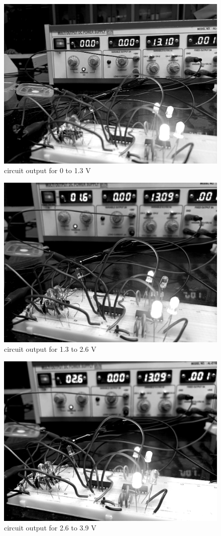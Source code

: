				
				\begin{figure}[H]
					\centering
					\label{photo:1}
					\includegraphics[width=0.6\columnwidth]{images/_00.png}
					\caption{circuit output for 0 to 1.3 V}
				\end{figure}
				\begin{figure}[H]
					\centering
					\label{photo:2}
					\includegraphics[width=0.6\columnwidth]{images/_16.png}
					\caption{circuit output for 1.3 to 2.6 V}
				\end{figure}
				\begin{figure}[H]
					\centering
					\label{photo:3}
					\includegraphics[width=0.6\columnwidth]{images/_26.png}
					\caption{circuit output for 2.6 to 3.9 V}
				\end{figure}
